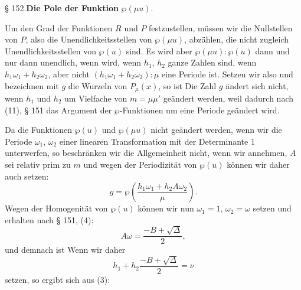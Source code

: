 
\begin{center}
§ 152.\qquad \textbf{Die Pole der Funktion} $\wp(\mu u)$.
\end{center}

Um den Grad der Funktionen $R$ und $P$ festzustellen, müssen wir die Nullstellen von $P$, also die Unendlichkeitsstellen von $\wp(\mu u)$, abzählen, die nicht zugleich Unendlichkeitsstellen von $\wp(u)$ sind. Es wird aber $\wp(\mu u):\wp(u)$ dann und nur dann unendlich, wenn
wird, wenn $h_1$, $h_2$ ganze Zahlen sind, wenn $h_1\omega_1 + h_2\omega_2$, aber nicht $(h_1\omega_1+h_2\omega_2):\mu$ eine Periode ist. Setzen wir also
und bezeichnen mit $g$ die Wurzeln von $P_\mu(x)$, so ist
Die Zahl $g$ ändert sich nicht, wenn $h_1$ und $h_2$ um Vielfache von $m=\mu\mu'$ geändert werden, weil dadurch nach (11), § 151 das Argument der $\wp$-Funktionen um eine Periode geändert wird.

Da die Funktionen $\wp(u)$ und $\wp(\mu u)$ nicht geändert werden, wenn wir die Periode $\omega_1$, $\omega_2$ einer linearen Transformation mit der Determinante 1 unterwerfen, so beschränken wir die Allgemeinheit nicht, wenn wir annehmen, $A$ sei relativ prim zu $m$ und wegen der Periodizität von $\wp(u)$ können wir daher auch setzen:
\[ g = \wp\left(\dfrac{h_1\omega_1+h_2 A\omega_2}{\mu}\right). \]
Wegen der Homogenität von $\wp(u)$ können wir nun $\omega_1=1$, $\omega_2=\omega$ setzen und erhalten nach § 151, (4):
\[ A\omega = \dfrac{-B+\sqrt{\Delta}}{2}, \]
und demnach ist
Wenn wir daher
\[ h_1 + h_2\dfrac{-B+\sqrt{\Delta}}{2} = \nu \]
setzen, so ergibt sich aus (3):

